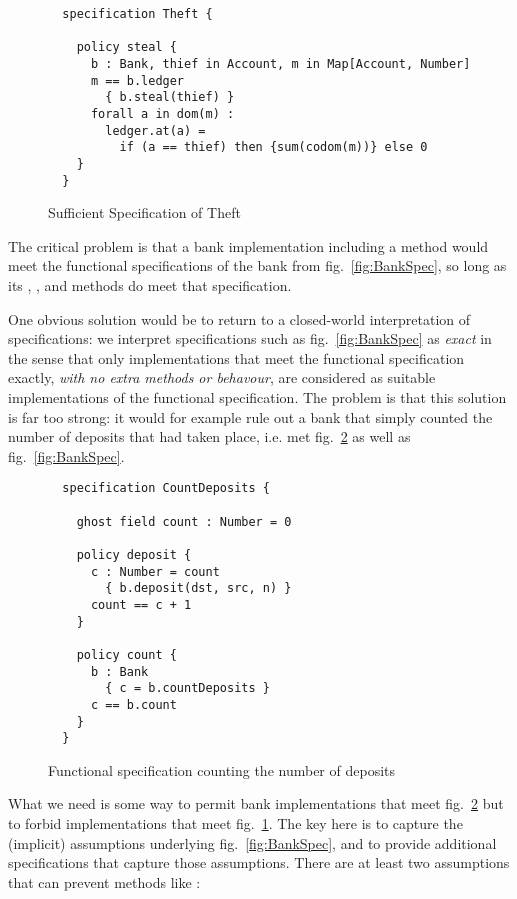\begin{figure}[tbp]
\begin{lstlisting}
  specification Theft {

    policy steal {
      b : Bank, thief in Account, m in Map[Account, Number]
      m == b.ledger
        { b.steal(thief) }
      forall a in dom(m) :
        ledger.at(a) =
          if (a == thief) then {sum(codom(m))} else 0
    }
  }
\end{lstlisting}
\caption{Sufficient Specification of Theft}
\label{fig:steal}
\end{figure}

The critical problem is that a bank implementation including a 
method would meet the functional specifications of the bank from
fig.~\ref{fig:BankSpec}, so long as its ,
, and  methods do meet
that specification.

One obvious solution would be to return to a closed-world
interpretation of specifications: we interpret specifications such as
fig.~\ref{fig:BankSpec} as \emph{exact} in the sense that only
implementations that meet the functional specification exactly,
\emph{with no extra methods or behavour}, are considered as suitable
implementations of the functional specification. The problem is that
this solution is far too strong: it would for example rule out a bank
that simply counted the number of deposits that had taken place,
i.e. met fig.~\ref{fig:count} as well as fig.~\ref{fig:BankSpec}.

\begin{figure}[tbp]
\begin{lstlisting}
  specification CountDeposits {

    ghost field count : Number = 0

    policy deposit {
      c : Number = count
        { b.deposit(dst, src, n) }
      count == c + 1
    }

    policy count {
      b : Bank
        { c = b.countDeposits }
      c == b.count
    }
  }
\end{lstlisting}
\caption{Functional specification counting the number of deposits}
\label{fig:count}
\end{figure}


What we need is some way to permit bank implementations that meet
fig.~\ref{fig:count} but to forbid implementations that meet fig.~\ref{fig:steal}.  
The key here is to capture the (implicit)
assumptions underlying fig.~\ref{fig:BankSpec}, and to provide
additional specifications that capture those assumptions.  There are
at least two assumptions that can prevent methods like :

